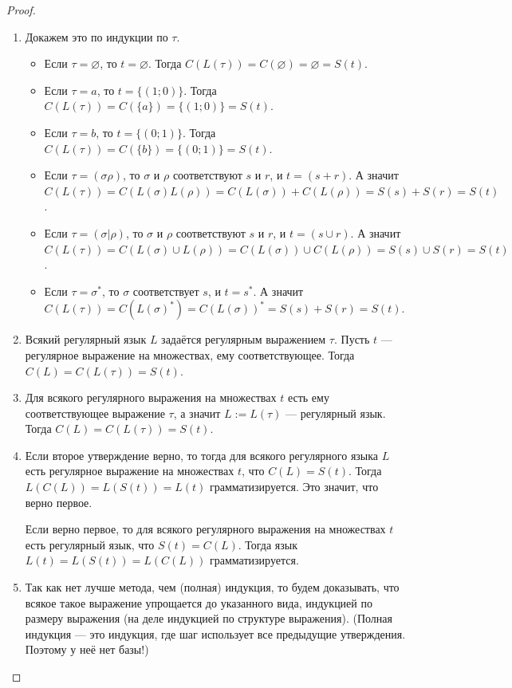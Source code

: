 \documentclass[12pt,a4paper]{article}
\begin{document}
\begin{problem}{8}
\begin{enumerate}
                \begin{proof}
                    \begin{enumerate}
                        \item Докажем это по индукции по $\tau$.

                            \begin{itemize}
                                \item Если $\tau = \varnothing$, то $t = \varnothing$. Тогда $C(L(\tau)) = C(\varnothing) = \varnothing = S(t)$.
                                \item Если $\tau = a$, то $t = \{(1; 0)\}$. Тогда $C(L(\tau)) = C(\{a\}) = \{(1; 0)\} = S(t)$.
                                \item Если $\tau = b$, то $t = \{(0; 1)\}$. Тогда $C(L(\tau)) = C(\{b\}) = \{(0; 1)\} = S(t)$.
                                \item Если $\tau = (\sigma\rho)$, то $\sigma$ и $\rho$ соответствуют $s$ и $r$, и $t = (s + r)$. А значит $C(L(\tau)) = C(L(\sigma) L(\rho)) = C(L(\sigma)) + C(L(\rho)) = S(s) + S(r) = S(t)$.
                                \item Если $\tau = (\sigma|\rho)$, то $\sigma$ и $\rho$ соответствуют $s$ и $r$, и $t = (s \cup r)$. А значит $C(L(\tau)) = C(L(\sigma) \cup L(\rho)) = C(L(\sigma)) \cup C(L(\rho)) = S(s) \cup S(r) = S(t)$.
                                \item Если $\tau = \sigma^*$, то $\sigma$ соответствует $s$, и $t = s^*$. А значит $C(L(\tau)) = C(L(\sigma)^*) = C(L(\sigma))^* = S(s) + S(r) = S(t)$.
                            \end{itemize}
                        \item Всякий регулярный язык $L$ задаётся регулярным выражением $\tau$. Пусть $t$ --- регулярное выражение на множествах, ему соответствующее. Тогда $C(L) = C(L(\tau)) = S(t)$.
                        \item Для всякого регулярного выражения на множествах $t$ есть ему соответствующее выражение $\tau$, а значит $L := L(\tau)$ --- регулярный язык. Тогда $C(L) = C(L(\tau)) = S(t)$.
                        \item Если второе утверждение верно, то тогда для всякого регулярного языка $L$ есть регулярное выражение на множествах $t$, что $C(L) = S(t)$. Тогда $L(C(L)) = L(S(t)) = L(t)$ грамматизируется. Это значит, что верно первое.

                            Если верно первое, то для всякого регулярного выражения на множествах $t$ есть регулярный язык, что $S(t) = C(L)$. Тогда язык $L(t) = L(S(t)) = L(C(L))$ грамматизируется.
                        \item Так как нет лучше метода, чем (полная) индукция, то будем доказывать, что всякое такое выражение упрощается до указанного вида, индукцией по размеру выражения (на деле индукцией по структуре выражения). (Полная индукция --- это индукция, где шаг использует все предыдущие утверждения. Поэтому у неё нет базы!)
                            

\end{enumerate}
\end{proof}
\end{enumerate}
\end{problem}
\end{document}
